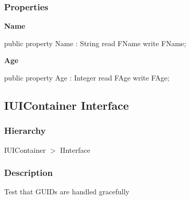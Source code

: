 \documentclass{report}
\newif\ifpdf
\begin{document}
\subsubsection*{\large{\textbf{Properties}}\normalsize\hspace{1ex}\hfill}
\begin{list}{}{
\setlength{\itemindent}{0cm}
\setlength{\listparindent}{0cm}
\setlength{\leftmargin}{\evensidemargin}
\addtolength{\leftmargin}{\tmplength}
\settowidth{\labelsep}{X}
\addtolength{\leftmargin}{\labelsep}
\setlength{\labelwidth}{\tmplength}
}
\label{ok_attributes.TPerson-Name}
\item[\textbf{Name}\hfill]
\ifpdf
\begin{flushleft}
\fi
\begin{ttfamily}
public property Name : String read FName write FName;\end{ttfamily}

\ifpdf
\end{flushleft}
\fi


\par  \label{ok_attributes.TPerson-Age}
\item[\textbf{Age}\hfill]
\ifpdf
\begin{flushleft}
\fi
\begin{ttfamily}
public property Age : Integer read FAge write FAge;\end{ttfamily}

\ifpdf
\end{flushleft}
\fi


\par  \end{list}
\ifpdf
\subsection*{\large{\textbf{IUIContainer Interface}}\normalsize\hspace{1ex}\hrulefill}
\else
\subsection*{IUIContainer Interface}
\fi
\label{ok_attributes.IUIContainer}
\subsubsection*{\large{\textbf{Hierarchy}}\normalsize\hspace{1ex}\hfill}
IUIContainer {$>$} IInterface
\subsubsection*{\large{\textbf{Description}}\normalsize\hspace{1ex}\hfill}
Test that GUIDs are handled gracefully
\end{document}

